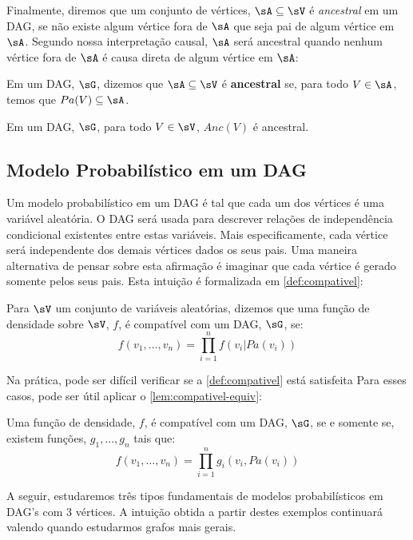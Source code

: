 Finalmente, diremos que um conjunto de vértices,
$\sA \subseteq \sV$ é \textit{ancestral} em um DAG,
se não existe algum vértice fora de $\sA$ que
seja pai de algum vértice em $\sA$.
Segundo nossa interpretação causal,
$\sA$ será ancestral quando 
nenhum vértice fora de $\sA$ 
é causa direta de 
algum vértice em $\sA$:

\begin{definition}
 \label{def:ancestral}
 Em um DAG, $\sG$,
 dizemos que $\sA \subseteq \sV$ é \textbf{ancestral} se,
 para todo $V \in \sA$, temos que
 $Pa(V) \subseteq \sA$.
\end{definition}

\begin{lemma}
 \label{lem:anc}
 Em um DAG, $\sG$,
 para todo $V \in \sV$, 
 $Anc(V)$ é ancestral.
\end{lemma}

\subsection{Modelo Probabilístico em um DAG}

Um modelo probabilístico em um DAG é
tal que cada um dos vértices é uma variável aleatória.
O DAG será usada para descrever 
relações de independência condicional existentes entre
estas variáveis.
Mais especificamente, cada vértice será
independente dos demais vértices dados os seus pais.
Uma maneira alternativa de pensar sobre esta afirmação é
imaginar que cada vértice é gerado somente pelos seus pais.
Esta intuição é formalizada em \cref{def:compativel}:

\begin{definition}
 \label{def:compativel}
 Para $\sV$ um conjunto de variáveis aleatórias,
 dizemos que uma função de densidade sobre $\sV$, 
 $f$, é compatível com um DAG, $\sG$, se:
 $$f(v_1,\ldots,v_n) = \prod_{i=1}^n f(v_i|Pa(v_i))$$
\end{definition}

Na prática, pode ser difícil verificar 
se a \cref{def:compativel} está satisfeita 
Para esses casos,
pode ser útil aplicar o 
\cref{lem:compativel-equiv}:

\begin{lemma}
 \label{lem:compativel-equiv}
 Uma função de densidade, $f$, é
 compatível com um DAG, $\sG$,
 se e somente se, existem funções,
 $g_1,\ldots,g_n$ tais que:
 $$f(v_1,\ldots,v_n) = \prod_{i=1}^n g_i(v_i, Pa(v_i))$$
\end{lemma}

A seguir, estudaremos três tipos fundamentais
de modelos probabilísticos em DAG's com
$3$ vértices. 
A intuição obtida a partir destes
exemplos continuará valendo quando
estudarmos grafos mais gerais.

